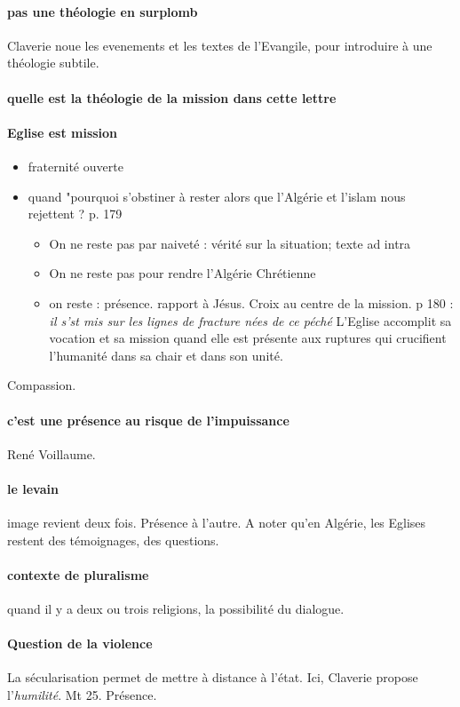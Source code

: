 \paragraph{pas une théologie en surplomb} Claverie noue les evenements et les textes de l'Evangile, pour introduire à une théologie subtile. 

\paragraph{quelle est la théologie de la mission dans cette lettre}
 
\paragraph{Eglise est mission}

\begin{itemize}
    \item fraternité ouverte
    \item quand "pourquoi s'obstiner à rester alors que l'Algérie et l'islam nous rejettent ? p. 179
    \begin{itemize}
        \item On ne reste pas par naiveté : vérité sur la situation; texte ad intra
        \item On ne reste pas pour rendre l'Algérie Chrétienne
        \item on reste : présence. rapport à Jésus. Croix au centre de la mission.  p 180 : \textit{il s'st mis sur les lignes de fracture nées de ce péché}
        L'Eglise accomplit sa vocation et sa mission quand elle est présente aux ruptures qui crucifient l'humanité dans sa chair et dans son unité. 
    \end{itemize}
\end{itemize}

 Compassion. 
 \paragraph{c'est une présence au risque de l'impuissance} René Voillaume. 

 \paragraph{le levain} image revient deux fois. Présence à l'autre. A noter qu'en Algérie, les Eglises restent des témoignages, des questions. 

\paragraph{contexte de pluralisme} quand il y a deux ou trois religions, la possibilité du dialogue. 
\paragraph{Question de la violence} La sécularisation permet de mettre à distance à l'état. Ici, Claverie propose l'\textit{humilité}. Mt 25. Présence. 
